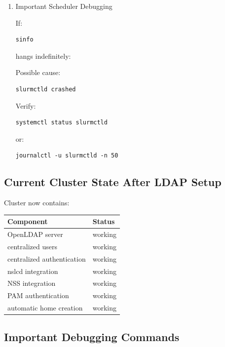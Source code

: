 \documentclass[11pt]{article}
\begin{document}
\begin{enumerate}
\begin{verbatim}
debug* up infinite 3 idle compute[01-03]
\end{verbatim}
\item Important Scheduler Debugging
\label{sec:orgb20639c}

If:

\begin{verbatim}
sinfo
\end{verbatim}

hangs indefinitely:

Possible cause:

\begin{verbatim}
slurmctld crashed
\end{verbatim}

Verify:

\begin{verbatim}
systemctl status slurmctld
\end{verbatim}

or:

\begin{verbatim}
journalctl -u slurmctld -n 50
\end{verbatim}
\end{enumerate}
\subsection{Current Cluster State After LDAP Setup}
\label{sec:org7884d49}

Cluster now contains:

\begin{center}
\begin{tabular}{ll}
Component & Status\\
\hline
OpenLDAP server & working\\
centralized users & working\\
centralized authentication & working\\
nslcd integration & working\\
NSS integration & working\\
PAM authentication & working\\
automatic home creation & working\\
\end{tabular}
\end{center}
\subsection{Important Debugging Commands}
\label{sec:org9706bb9}
\end{document}
